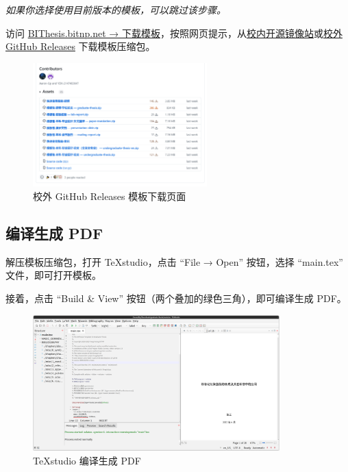 \textit{如果你选择使用目前版本的模板，可以跳过该步骤。}

访问 \href{https://bithesis.bitnp.net/guide/downloading-using-templates.html#下载模板包并解压}{BIThesis.bitnp.net → 下载模板}，按照网页提示，从\href{https://mirror.bit.edu.cn/github-release/BITNP/BIThesis/LatestRelease/}{校内开源镜像站}或\href{https://github.com/BITNP/BIThesis/releases/latest}{校外 GitHub Releases}
下载模板压缩包。


\begin{figure}[H]
  \begin{center}
    \includegraphics[width=0.6\textwidth]{imgs/github-releases.png}
  \end{center}
  \caption{校外 GitHub Releases 模板下载页面}
  \label{fig:local-template-download}
\end{figure}

\clearpage
\subsection{编译生成 PDF}

解压模板压缩包，打开 TeXstudio，点击 ``File → Open'' 按钮，选择 ``main.tex'' 文件，即可打开模板。

接着，点击 ``Build \& View'' 按钮（两个叠加的绿色三角），即可编译生成 PDF。

\begin{figure}[H]
  \begin{center}
    \includegraphics[width=0.85\textwidth]{imgs/texstudio-compile-and-view.png}
  \end{center}
  \caption{TeXstudio 编译生成 PDF}
  \label{fig:texstudio-compile-and-view}
\end{figure}

